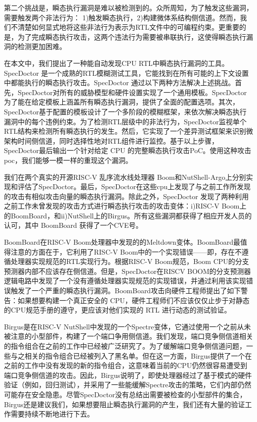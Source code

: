 第二个挑战是，瞬态执行漏洞是难以被检测到的。众所周知，为了触发这些漏洞，需要触发两个非法行为： 1)触发瞬态执行，2)构建微体系结构侧信道。然而，我们不清楚如何显式地将这些非法行为表示为RTL文件中的可编程约束。更重要的是，为了完成瞬态执行攻击，这两个违法行为需要被串联执行，这使得瞬态执行漏洞的检测更加困难。\par

在本文中，我们提出了一种能自动发现CPU RTL中瞬态执行漏洞的工具。SpecDoctor 是一个成熟的RTL模糊测试工具，它能找到在所有可能的上下文设置中都能执行的瞬态执行攻击。SpecDoctor 通过以下两种方法解决上述挑战。首先，SpecDoctor对所有的威胁模型和硬件设置实现了一个通用模板。SpecDoctor为了能在给定模板上涵盖所有瞬态执行漏洞，提供了全面的配置选项。其次，SpecDoctor基于配置的模板设计了一个多阶段的模糊框架，来依次解决瞬态执行漏洞中的每个违例约束。为了检测RTL层级中的非法行为，SpecDoctor监视单个RTL结构来检测所有瞬态执行的发生。然后，它实现了一个差异测试框架来识别微架构时间侧信道，同时选择性地对RTL组件进行监控。基于以上步骤，SpecDoctor最后输出一个针对给定 CPU 的完整瞬态执行攻击PoC。使用这种攻击poc，我们能够一模一样的重现这个漏洞。\par

我们在两个真实的开源RISC-V 乱序流水线处理器 Boom和NutShell-Argo上分别实现和评估了SpecDoctor。最后，SpecDoctor在这些cpu上发现了与之前工作所发现的攻击有相似攻击向量的瞬态执行漏洞。除此之外，SpecDoctor 发现了两种利用之前工作未曾发现的攻击方式进行瞬态执行攻击的攻击变体：i)RISC-V Boom上的BoomBoard，和ii)NutShell上的Birgus。所有这些漏洞都获得了相应开发人员的认可，其中 BoomBoard 获得了一个CVE号。\par

BoomBoard在RISC-V Boom处理器中发现的的Meltdown变体。BoomBoard最值得注意的方面在于，它利用了RISC-V Boom中的一个实现错误——即，存在不遵循处理器实现规范的RTL实现行为。根据RISC-V Boom规范，Boom CPU的分支预测器内部不应该存在侧信道。但是，SpecDoctor在RISCV BOOM的分支预测器逻辑电路中发现了一个没有遵循处理器实现规范的实现错误，并通过利用该实现错误触发了一个严重的瞬态执行漏洞。BoomBoard攻击向硬件工程师提出了如下警告：如果想要构建一个真正安全的 CPU，硬件工程师们不应该仅仅止步于对静态的CPU规范手册的遵守，更应该对他们实现的 RTL 进行动态的测试验证。\par

Birgus是在RISC-V NutShell中发现的一个Spectre变体，它通过使用一个之前从未被注意的小型部件，构建了一个端口争用侧信道。我们发现，端口竞争侧信道相关的指令组合在之前的工作中已经被广泛研究了。为了缓解端口竞争侧信道问题，一些与之相关的指令组合已经被列入了黑名单。但在这一方面，Birgus提供了一个在之前的工作中没有发现的新的指令组合，这意味着当前的CPU仍然很容易遭受到端口竞争侧信道的攻击。因此，Birgus说明了，即使处理器经过了基于模式的硬件验证（例如，回归测试），并采用了一些能缓解Spectre攻击的策略，它们内部仍然可能存在安全隐患。尽管SpecDoctor没有总结出需要被检查的小型部件的集合，Birgus还是建议我们，如果想要阻止瞬态执行漏洞的产生，我们还有大量的验证工作需要持续不断地进行下去。\par

